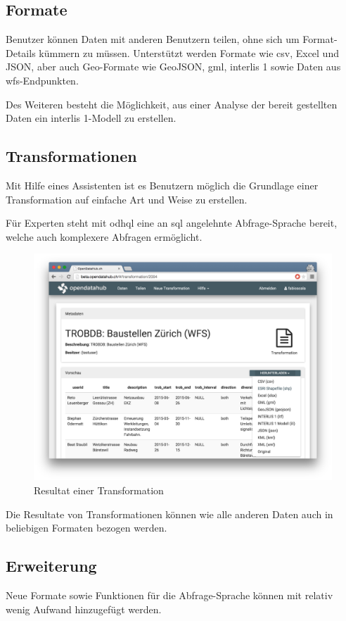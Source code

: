 \subsection*{Formate}
Benutzer können Daten mit anderen Benutzern teilen, ohne sich um Format-Details kümmern zu müssen. Unterstützt werden Formate wie \acs{csv}, Excel und JSON, aber auch Geo-Formate wie GeoJSON, \acs{gml}, \gls{interlis} 1 sowie Daten aus \gls{wfs}-Endpunkten.

Des Weiteren besteht die Möglichkeit, aus einer Analyse der bereit gestellten Daten ein \gls{interlis} 1-Modell zu erstellen.

\subsection*{Transformationen}
Mit Hilfe eines Assistenten ist es Benutzern möglich die Grundlage einer Transformation auf einfache Art und Weise zu erstellen. 

Für Experten steht mit \gls{odhql} eine an \acs{sql} angelehnte Abfrage-Sprache bereit, welche auch komplexere Abfragen ermöglicht.

\begin{figure}[H]
    \centering
    \includegraphics[width=0.8\linewidth]{fig/transformation-detail}
    \vspace{-0.5cm}\caption*{Resultat einer Transformation}
\end{figure}

Die Resultate von Transformationen können wie alle anderen Daten auch in beliebigen Formaten bezogen werden.

\subsection*{Erweiterung}
Neue Formate sowie Funktionen für die Abfrage-Sprache können mit relativ wenig Aufwand hinzugefügt werden.

